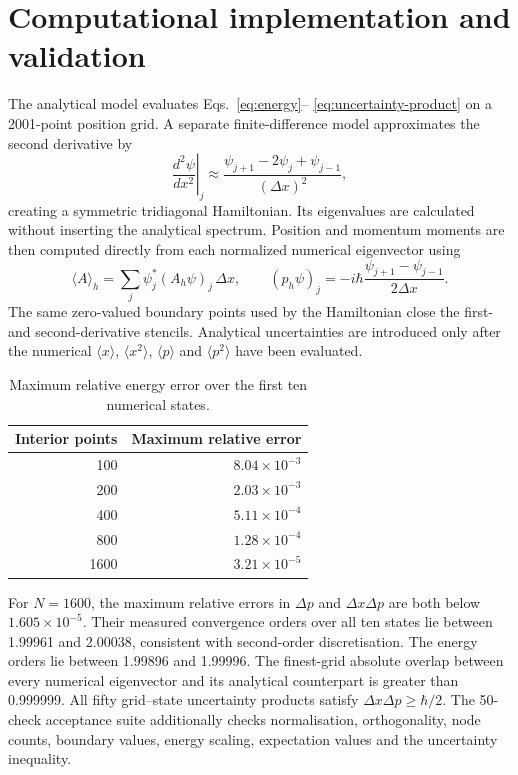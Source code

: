 \documentclass[11pt,a4paper]{article}
\begin{document}
\section{Computational implementation and validation}

The analytical model evaluates Eqs.~\eqref{eq:energy}--
\eqref{eq:uncertainty-product} on a 2001-point position grid.  A separate
finite-difference model approximates the second derivative by
\begin{equation}
\left.\frac{d^2\psi}{dx^2}\right|_j
\approx\frac{\psi_{j+1}-2\psi_j+\psi_{j-1}}{(\Delta x)^2},
\end{equation}
creating a symmetric tridiagonal Hamiltonian.  Its eigenvalues are calculated
without inserting the analytical spectrum.  Position and momentum moments are
then computed directly from each normalized numerical eigenvector using
\begin{equation}
\langle A\rangle_h=\sum_j\psi_j^*(A_h\psi)_j\,\Delta x,
\qquad
(p_h\psi)_j=-i\hbar\frac{\psi_{j+1}-\psi_{j-1}}{2\Delta x}.
\end{equation}
The same zero-valued boundary points used by the Hamiltonian close the
first- and second-derivative stencils.  Analytical uncertainties are introduced
only after the numerical $\langle x\rangle$, $\langle x^2\rangle$,
$\langle p\rangle$ and $\langle p^2\rangle$ have been evaluated.

\begin{table}[H]
\centering
\caption{Maximum relative energy error over the first ten numerical states.}
\begin{tabular}{rr}
\toprule
Interior points & Maximum relative error\\
\midrule
100  & $8.04\times10^{-3}$\\
200  & $2.03\times10^{-3}$\\
400  & $5.11\times10^{-4}$\\
800  & $1.28\times10^{-4}$\\
1600 & $3.21\times10^{-5}$\\
\bottomrule
\end{tabular}
\end{table}

For $N=1600$, the maximum relative errors in $\Delta p$ and
$\Delta x\Delta p$ are both below $1.605\times10^{-5}$.  Their measured
convergence orders over all ten states lie between 1.99961 and 2.00038,
consistent with second-order discretisation.  The energy orders lie between
1.99896 and 1.99996.  The finest-grid absolute
overlap between every numerical eigenvector and its analytical counterpart is
greater than 0.999999.  All fifty grid--state uncertainty products satisfy
$\Delta x\Delta p\geq\hbar/2$.  The 50-check acceptance suite additionally checks
normalisation, orthogonality, node counts, boundary values, energy scaling,
expectation values and the uncertainty inequality.
\end{document}
